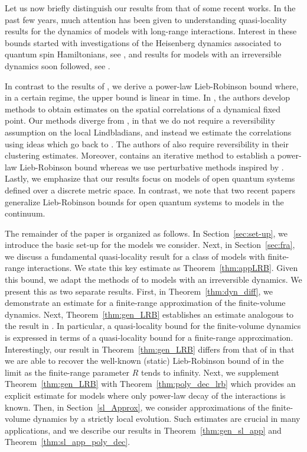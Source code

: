 \documentclass{article}
\newcommand{\<}{\langle}
\renewcommand{\>}{\rangle}
\numberwithin{equation}{section}
\theoremstyle{definition}
\begin{document}
Let us now briefly distinguish our results from that of some recent works. In the past few years, 
much attention has been given to understanding quasi-locality results for the dynamics of models
with long-range interactions. Interest in these bounds started with investigations of the Heisenberg dynamics 
associated to quantum spin Hamiltonians, see \cite{Else, Foss-Feig, KuwaharaSaito, Matsuta, Tran, Tran_2019}, and results for models with an irreversible dynamics
soon followed, see \cite{Guo, Sweke}.  

In contrast to the results of \cite{Sweke}, we derive a power-law Lieb-Robinson bound where, in a certain regime, the upper bound is linear in time.  In \cite[Theorem 3]{KastoryanoEisert}, the authors develop methods to obtain estimates on the spatial correlations of a dynamical fixed point. Our methods diverge from \cite{KastoryanoEisert}, in that we do not require a reversibility assumption on the local Lindbladians, and instead we estimate the correlations using ideas which go back to \cite{Poulin}. The authors of \cite{Guo} also require reversibility in their clustering estimates. Moreover, \cite{Guo} contains an iterative method to establish a power-law Lieb-Robinson bound whereas we use perturbative methods inspired by \cite{Matsuta}. Lastly, we emphasize that our results focus on models of open quantum systems defined over a discrete metric space. In contrast, we note that two recent papers \cite{Breteaux, Breteaux_preprint} generalize Lieb-Robinson bounds for open quantum systems to models in the continuum. 

The remainder of the paper is organized as follows. In Section~\ref{sec:set-up}, we introduce the 
basic set-up for the models we consider. Next, in Section~\ref{sec:fra}, 
we discuss a fundamental quasi-locality result for a class of models with finite-range interactions. We state this key estimate as Theorem~\ref{thm:appLRB}.  
Given this bound, we adapt the methods of \cite{Matsuta} to models with an irreversible dynamics.
We present this as two separate results. First, in Theorem~\ref{thm:dyn_diff}, 
we demonstrate an estimate for a finite-range approximation of the finite-volume dynamics.
Next, Theorem~\ref{thm:gen_LRB} establishes an estimate analogous to the result in \cite[Theorem 2.1]{Matsuta}.
In particular, a quasi-locality bound for the finite-volume dynamics is expressed in terms of
a quasi-locality bound for a finite-range approximation.  
Interestingly, our result in Theorem~\ref{thm:gen_LRB} differs from that of \cite[Theorem 2.1]{Matsuta}
in that we are able to recover the well-known (static) Lieb-Robinson bound of \cite[Theorem 2]{NachtergaeleVershyninaZagrebnov} in the limit as the finite-range parameter $R$ tends to infinity. Next, we supplement Theorem~\ref{thm:gen_LRB} with Theorem~\ref{thm:poly_dec_lrb} which 
provides an explicit estimate for models where only power-law decay of the interactions is known.
Then, in Section~\ref{sl_Approx}, we consider approximations of the finite-volume dynamics by a strictly local evolution. 
Such estimates are crucial in many applications, and we describe our results in
Theorem~\ref{thm:gen_sl_app} and Theorem~\ref{thm:sl_app_poly_dec}.
 
\end{document}
